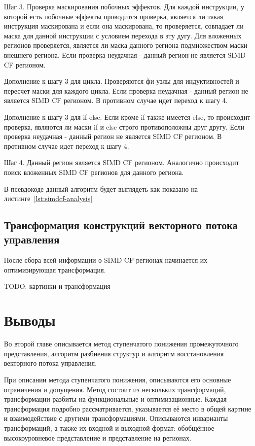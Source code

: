Шаг 3. Проверка маскирования побочных эффектов. Для каждой инструкции, у которой есть побочные эффекты проводится проверка, является ли такая инструкция маскирована и если она маскирована, то проверяется, совпадает ли маска для данной инструкции с условием перехода в эту дугу. Для вложенных регионов проверяется, является ли маска данного региона подмножеством маски внешнего региона. Если проверка неудачная - данный регион не является SIMD CF регионом.

Дополнение к шагу 3 для цикла. Проверяются фи-узлы для индуктивностей и пересчет маски для каждого цикла. Если проверка неудачная - данный регион не является SIMD CF регионом. В противном случае идет переход к шагу 4.

Дополнение к шагу 3 для if-else. Если кроме if также имеется else, то происходит проверка, являются ли маски if и else строго противоположны друг другу. Если проверка неудачная - данный регион не является SIMD CF регионом. В противном случае идет переход к шагу 4.

Шаг 4. Данный регион является SIMD CF регионом. Аналогично происходит поиск вложенных SIMD CF регионов для данного региона.

В псевдокоде данный алгоритм будет выглядеть как показано на листинге~\ref{lst:simdcf-analysis}

\subsection{Трансформация конструкций векторного потока управления}\label{sec:lowering/simdcf/optimization}

После сбора всей информации о SIMD CF регионах начинается их оптимизирующая трансформация.

TODO: картинки и трансформация

\section{Выводы}\label{sec:lowering/outcome}

Во второй главе описывается метод ступенчатого понижения промежуточного представления, алгоритм разбиения структур и алгоритм восстановления векторного потока управления.

При описании метода ступенчатого понижения, описываются его основные ограничения и допущения. Метод состоит из нескольких трансформаций, трансформации разбиты на функциональные и оптимизационные. Каждая трансформация подробно рассматривается, указывается её место в общей картине и взаимодействие с другими трансформациями. Описываются инварианты трансформаций, а также их входной и выходной формат: обобщённое высокоуровневое представление и представление на регионах.

